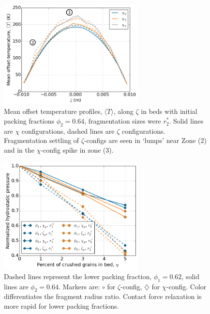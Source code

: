 \begin{figure}[!t]
    \centering
    \includegraphics[width=0.65\textwidth]{figures/64-percent-T-profiles-reduced.png}
    \caption{Mean offset temperature profiles, $\langle T \rangle$, along $\zeta$ in beds with initial packing fractions $\phi_2 = 0.64$, fragmentation sizes were $r_2^*$. Solid lines are $\chi$ configurations, dashed lines are $\zeta$ configurations. Fragmentation settling of $\zeta$-configs are seen in `lumps' near Zone (2) and in the $\chi$-config spike in zone (3).}
    \label{fig:64-T-profile}
\end{figure}

\begin{figure}[!t]
    \centering
    \includegraphics[width = 0.65\textwidth]{figures/eta-sigma.png}
    \caption{Dashed lines represent the lower packing fraction, $\phi_1 = 0.62$, solid lines are $\phi_2 = 0.64$. Markers are: $\circ$ for $\zeta$-config, $\diamondsuit$ for $\chi$-config. Color differentiates the fragment radius ratio. Contact force relaxation is more rapid for lower packing fractions.}\label{fig:eta-sigma}
\end{figure}

